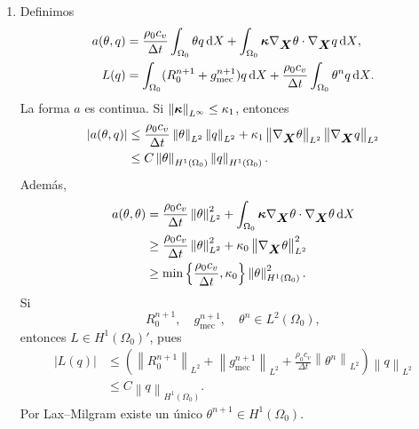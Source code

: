 \documentclass[11pt]{article}
\newcommand{\norm}[1]{\left\lVert #1\right\rVert}
\newcommand{\abs}[1]{\left|#1\right|}
\def\vec   #1{\mbox{\boldmath $#1$}{}}
\def\ten   #1{\mbox{\boldmath $#1$}{}}
\def\dX{\mbox{\(\,\mathrm{d}X\)}}
\begin{document}
\begin{enumerate}[label=\textbf{\arabic*.}, leftmargin=*]
\begin{enumerate}[label=(\alph*)]
        \item Definimos
        \[
        \begin{aligned}
            a(\theta,q)
            &=
            \frac{\rho_0c_v}{\Delta t}\int_{\Omega_0}\theta q\dX
            +\int_{\Omega_0}\ten\kappa\nabla_{\vec X}\theta\cdot\nabla_{\vec X}q\dX,\\
            L(q)
            &=
            \int_{\Omega_0}(R_0^{n+1}+g_{\mathrm{mec}}^{n+1})q\dX
            +\frac{\rho_0c_v}{\Delta t}\int_{\Omega_0}\theta^nq\dX.
        \end{aligned}
        \]
        La forma $a$ es continua. Si $\norm{\ten\kappa}_{L^\infty}\le\kappa_1$, entonces
        \[
        \begin{aligned}
            \abs{a(\theta,q)}
            &\le
            \frac{\rho_0c_v}{\Delta t}
            \norm{\theta}_{L^2}
            \norm{q}_{L^2}
            +\kappa_1
            \norm{\nabla_{\vec X}\theta}_{L^2}
            \norm{\nabla_{\vec X}q}_{L^2}\\
            &\le
            C\norm{\theta}_{H^1(\Omega_0)}
            \norm{q}_{H^1(\Omega_0)}.
        \end{aligned}
        \]
        Además,
        \[
        \begin{aligned}
            a(\theta,\theta)
            &=
            \frac{\rho_0c_v}{\Delta t}\norm{\theta}_{L^2}^2
            +\int_{\Omega_0}\ten\kappa\nabla_{\vec X}\theta
            \cdot\nabla_{\vec X}\theta\dX\\
            &\ge
            \frac{\rho_0c_v}{\Delta t}\norm{\theta}_{L^2}^2
            +\kappa_0\norm{\nabla_{\vec X}\theta}_{L^2}^2\\
            &\ge
            \min\left\{\frac{\rho_0c_v}{\Delta t},\kappa_0\right\}
            \norm{\theta}_{H^1(\Omega_0)}^2.
        \end{aligned}
        \]
        Si
        \[
            R_0^{n+1},\quad g_{\mathrm{mec}}^{n+1},\quad \theta^n\in L^2(\Omega_0),
        \]
        entonces $L\in H^1(\Omega_0)'$, pues
        \[
        \begin{aligned}
            \abs{L(q)}
            &\le
            \left(
            \norm{R_0^{n+1}}_{L^2}
            +\norm{g_{\mathrm{mec}}^{n+1}}_{L^2}
            +\frac{\rho_0c_v}{\Delta t}\norm{\theta^n}_{L^2}
            \right)
            \norm{q}_{L^2}\\
            &\le
            C\norm{q}_{H^1(\Omega_0)}.
        \end{aligned}
        \]
        Por Lax--Milgram existe un único $\theta^{n+1}\in H^1(\Omega_0)$.


\end{enumerate}
\end{enumerate}
\end{document}

